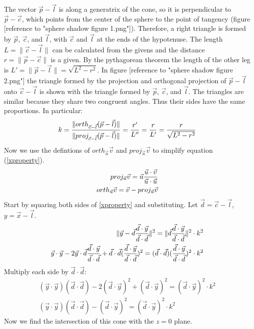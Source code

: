\documentclass[letter,10pt]{article}
\begin{document}
\begin{appendices}
The vector $\vec{p} - \vec{l}$ is along a generatrix of the cone, so it is perpendicular to $\vec{p} - \vec{c}$, which points from the center of the sphere to the point of tangency (figure [reference to "sphere shadow figure 1.png"]). Therefore, a right triangle is formed by $\vec{p}$, $\vec{c}$, and $\vec{l}$, with $\vec{c}$ and $\vec{l}$ at the ends of the hypotenuse. The length $L=\|\vec{c}-\vec{l}\|$ can be calculated from the givens and the distance $r=\|\vec{p}-\vec{c}\|$ is a given. By the pythagorean theorem the length of the other leg is $L'=\|\vec{p}-\vec{l}\|=\sqrt{L^2-r^2}$. In figure [reference to "sphere shadow figure 2.png"] the triangle formed by the projection and orthogonal projection of $\vec{p}-\vec{l}$ onto $\vec{c}-\vec{l}$ is shown with the triangle formed by $\vec{p}$, $\vec{c}$, and $\vec{l}$. The triangles are similar because they share two congruent angles. Thus their sides have the same proportions. In particular:
\[
k = {\|orth_{\vec{c}-\vec{l}} (\vec{p} - \vec{l})\|\over \|proj_{\vec{c}-\vec{l}} (\vec{p} - \vec{l})\|} = {r'\over L''} = {r\over L'} = {r\over\sqrt{L^2-r^2}}
\]
Now we use the defintions of $orth_{\vec{u}} \vec{v}$ and $proj_{\vec{u}} \vec{v}$ to simplify equation (\ref{xproperty}).
\begin{align*}
proj_{\vec{u}} \vec{v} = \vec{u} {\vec{u}\cdot\vec{v}\over \vec{u}\cdot\vec{u}}\\
orth_{\vec{u}} \vec{v} = \vec{v} - proj_{\vec{u}} \vec{v}
\end{align*}
Start by squaring both sides of \ref{xproperty} and substituting. Let $\vec{d} = \vec{c}-\vec{l}$, $y = \vec{x}-\vec{l}$.
\begin{align*}
\|\vec{y} - \vec{d} {\vec{d}\cdot\vec{y}\over \vec{d}\cdot\vec{d}}\|^2 = \|\vec{d} {\vec{d}\cdot\vec{y}\over \vec{d}\cdot\vec{d}}\|^2 \cdot k^2\\
\vec{y}\cdot\vec{y}-2\vec{y}\cdot\vec{d} {\vec{d}\cdot\vec{y}\over \vec{d}\cdot\vec{d}}+\vec{d}\cdot\vec{d}({\vec{d}\cdot\vec{y}\over \vec{d}\cdot\vec{d}})^2 = (\vec{d}\cdot\vec{d}) ({\vec{d}\cdot\vec{y}\over \vec{d}\cdot\vec{d}})^2 \cdot k^2
\end{align*}
Multiply each side by $\vec{d}\cdot\vec{d}$:
\begin{align*}
(\vec{y}\cdot\vec{y})(\vec{d}\cdot\vec{d})-2(\vec{d}\cdot\vec{y})^2+(\vec{d}\cdot\vec{y})^2  = (\vec{d}\cdot\vec{y})^2 \cdot k^2\\
(\vec{y}\cdot\vec{y})(\vec{d}\cdot\vec{d})-(\vec{d}\cdot\vec{y})^2  = (\vec{d}\cdot\vec{y})^2 \cdot k^2
\end{align*}
Now we find the intersection of this cone with the $z=0$ plane.

\end{appendices}
\end{document}
